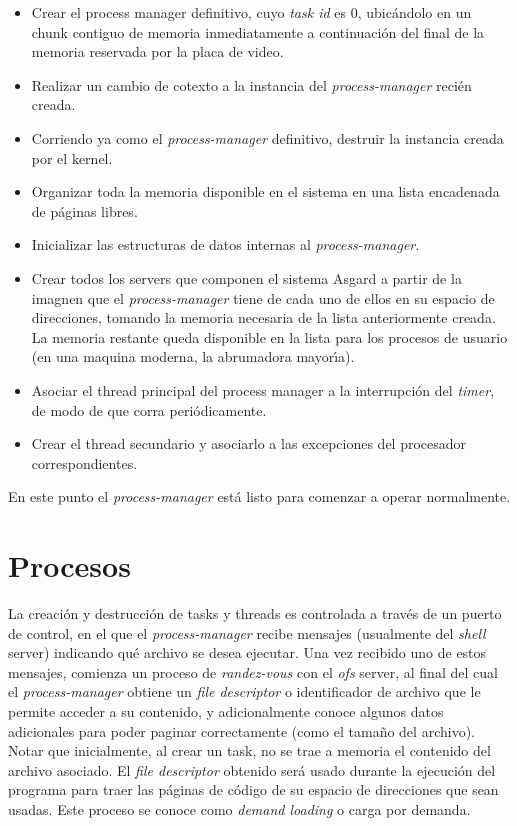 \documentclass[11pt, letterpaper, twoside]{book}
\begin{document}
\begin{itemize}
\item Crear el process manager definitivo, cuyo \emph{task id} es 0, ubic\'andolo en un chunk contiguo de memoria inmediatamente a continuaci\'on del final de la memoria reservada por la placa de video.
\item Realizar un cambio de cotexto a la instancia del \emph{process-manager} reci\'en creada.
\item Corriendo ya como el \emph{process-manager} definitivo, destruir la instancia creada por el kernel.
\item Organizar toda la memoria disponible en el sistema en una lista encadenada de p\'aginas libres.
\item Inicializar las estructuras de datos internas al \emph{process-manager}.
\item Crear todos los servers que componen el sistema Asgard a partir de la imagnen que el \emph{process-manager} tiene de cada uno de ellos en su espacio de direcciones, tomando la memoria necesaria de la lista anteriormente creada. La memoria restante queda disponible en la lista para los procesos de usuario (en una maquina moderna, la abrumadora mayor\'\i{}a).
\item Asociar el thread principal del process manager a la interrupci\'on del \emph{timer}, de modo de que corra peri\'odicamente.
\item Crear el thread secundario y asociarlo a las excepciones del procesador correspondientes. 
\end{itemize}

En este punto el \emph{process-manager} est\'a listo para comenzar a operar normalmente.

\section{Procesos}

La creaci\'on y destrucci\'on de tasks y threads es controlada a trav\'es de un puerto de control, en el que el \emph{process-manager} recibe mensajes (usualmente del \emph{shell} server) indicando qu\'e archivo se desea ejecutar. Una vez recibido uno de estos mensajes, comienza un proceso de \emph{randez-vous} con el \emph{ofs} server, al final del cual el \emph{process-manager} obtiene un \emph{file descriptor} o identificador de archivo que le permite acceder a su contenido, y adicionalmente conoce algunos datos adicionales para poder paginar correctamente (como el tama\~no del archivo). Notar que inicialmente, al crear un task, no se trae a memoria el contenido del archivo asociado. El \emph{file descriptor} obtenido ser\'a usado durante la ejecuci\'on del programa para traer las p\'aginas de c\'odigo de su espacio de direcciones que sean usadas. Este proceso se conoce como \emph{demand loading} o carga por demanda.
\end{document}
